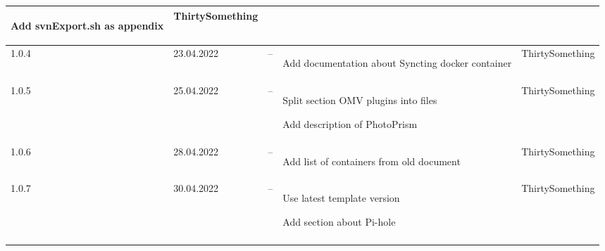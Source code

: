 \begin{tiny}
\begin{longtable}{ | p{} | p{} | p{} | P{0.49\textwidth} | p{0.15\textwidth} | }
\begin{tsLTItemize}
            \item Add svnExport.sh as appendix
        \end{tsLTItemize}
                                 &
        ThirtySomething            \\
        \hline
        1.0.4                    &
        23.04.2022               &
        --                       &
        \begin{tsLTItemize}
            \item Add documentation about Syncting docker container
        \end{tsLTItemize}
                                 &
        ThirtySomething            \\
        \hline
        1.0.5                    &
        25.04.2022               &
        --                       &
        \begin{tsLTItemize}
            \item Split section OMV plugins into files
            \item Add description of PhotoPrism
        \end{tsLTItemize}
                                 &
        ThirtySomething            \\
        \hline
        1.0.6                    &
        28.04.2022               &
        --                       &
        \begin{tsLTItemize}
            \item Add list of containers from old document
        \end{tsLTItemize}
                                 &
        ThirtySomething            \\
        \hline
        1.0.7                    &
        30.04.2022               &
        --                       &
        \begin{tsLTItemize}
            \item Use latest template version
            \item Add section about Pi-hole
        \end{tsLTItemize}
                                 &
        ThirtySomething            \\
        \hline
    \end{longtable}
\end{tiny}
